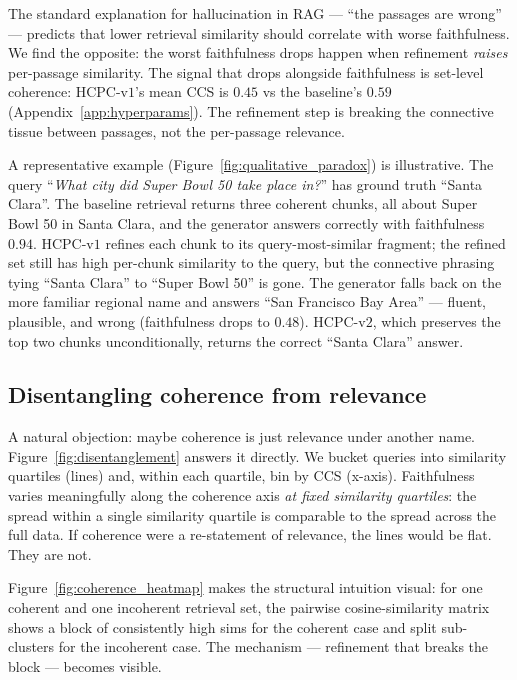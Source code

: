 The standard explanation for hallucination in RAG --- ``the passages
are wrong'' --- predicts that lower retrieval similarity should
correlate with worse faithfulness. We find the opposite: the worst
faithfulness drops happen when refinement \emph{raises} per-passage
similarity. The signal that drops alongside faithfulness is set-level
coherence: HCPC-v$1$'s mean CCS is $0.45$ vs the baseline's $0.59$
(Appendix~\ref{app:hyperparams}). The refinement step is breaking
the connective tissue between passages, not the per-passage relevance.



A representative example (Figure~\ref{fig:qualitative_paradox}) is
illustrative. The query ``\emph{What city did Super Bowl 50 take place
in?}'' has ground truth ``Santa Clara''. The baseline retrieval
returns three coherent chunks, all about Super Bowl 50 in Santa
Clara, and the generator answers correctly with faithfulness $0.94$.
HCPC-v$1$ refines each chunk to its query-most-similar fragment;
the refined set still has high per-chunk similarity to the query, but
the connective phrasing tying ``Santa Clara'' to ``Super Bowl 50'' is
gone. The generator falls back on the more familiar regional name and
answers ``San Francisco Bay Area'' --- fluent, plausible, and wrong
(faithfulness drops to $0.48$). HCPC-v$2$, which preserves the top
two chunks unconditionally, returns the correct ``Santa Clara'' answer.

\subsection{Disentangling coherence from relevance}
\label{sec:paradox:disentangle}



A natural objection: maybe coherence is just relevance under another
name. Figure~\ref{fig:disentanglement} answers it directly. We bucket
queries into similarity quartiles (lines) and, within each quartile,
bin by CCS (x-axis). Faithfulness varies meaningfully along the
coherence axis \emph{at fixed similarity quartiles}: the spread within
a single similarity quartile is comparable to the spread across the
full data. If coherence were a re-statement of relevance, the lines
would be flat. They are not.



Figure~\ref{fig:coherence_heatmap} makes the structural intuition
visual: for one coherent and one incoherent retrieval set, the
pairwise cosine-similarity matrix shows a block of consistently high
sims for the coherent case and split sub-clusters for the incoherent
case. The mechanism --- refinement that breaks the block ---
becomes visible.

